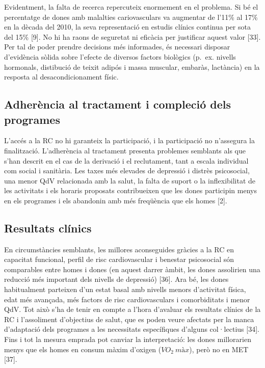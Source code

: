 \documentclass[CAT]{TFUOC}%
\begin{document}
\bigskip

Evidentment, la falta de recerca repercuteix enormement en el problema. Si bé el percentatge de dones amb malalties cariovasculars va augmentar de l'11\% al 17\% en la dècada del 2010, la seva representació en estudis clínics continua per sota del 15\% {[}9{]}. No hi ha raons de seguretat ni eficàcia per justificar aquest valor {[}33{]}. Per tal de poder prendre decisions més informades, és necessari disposar d'evidència sòlida sobre l'efecte de diversos factors biològics (p.~ex. nivells hormonals, distibució de teixit adipós i massa muscular, embaràs, lactància) en la resposta al desacondicionament físic.

\subsection{Adherència al tractament i compleció dels programes}\label{adheruxe8ncia-al-tractament-i-compleciuxf3-dels-programes}

L'accés a la RC no hi garanteix la participació, i la participació no n'assegura la finalització. L'adherència al tractament presenta problemes semblants als que s'han descrit en el cas de la derivació i el reclutament, tant a escala individual com social i sanitària. Les taxes més elevades de depressió i distrès psicosocial, una menor QdV relacionada amb la salut, la falta de suport o la inflexibilitat de les activitats i els horaris proposats contribueixen que les dones participin menys en els programes i els abandonin amb més freqüència que els homes {[}2{]}.

\subsection{Resultats clínics}\label{resultats-cluxednics}

En circumstàncies semblants, les millores aconseguides gràcies a la RC en capacitat funcional, perfil de risc cardiovascular i benestar psicosocial són comparables entre homes i dones (en aquest darrer àmbit, les dones assolirien una reducció més important dels nivells de depressió) {[}36{]}. Ara bé, les dones habitualment parteixen d'un estat basal amb nivells menors d'activitat física, edat més avançada, més factors de risc cardiovasculars i comorbiditats i menor QdV. Tot això s'ha de tenir en compte a l'hora d'avaluar els resultats clínics de la RC i l'assoliment d'objectius de salut, que es poden veure afectats per la manca d'adaptació dels programes a les necessitats específiques d'alguns col·lectius {[}34{]}. Fins i tot la mesura emprada pot canviar la interpretació: les dones millorarien menys que els homes en consum màxim d'oxigen (\(VO_2\ màx\)), però no en MET {[}37{]}.
\end{document}
